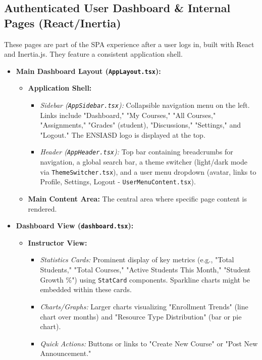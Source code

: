 \documentclass[12pt,a4paper]{article}
\begin{document}
\subsection{Authenticated User Dashboard \& Internal Pages (React/Inertia)}

These pages are part of the SPA experience after a user logs in, built with React and Inertia.js. They feature a consistent application shell.

\begin{itemize}
    \item \textbf{Main Dashboard Layout (\texttt{AppLayout.tsx}):}
    \begin{itemize}
        \item \textbf{Application Shell:}
        \begin{itemize}
            \item \textit{Sidebar (\texttt{AppSidebar.tsx}):} Collapsible navigation menu on the left. Links include "Dashboard," "My Courses," "All Courses," "Assignments," "Grades" (student), "Discussions," "Settings," and "Logout." The ENSIASD logo is displayed at the top.
            \item \textit{Header (\texttt{AppHeader.tsx}):} Top bar containing breadcrumbs for navigation, a global search bar, a theme switcher (light/dark mode via \texttt{ThemeSwitcher.tsx}), and a user menu dropdown (avatar, links to Profile, Settings, Logout - \texttt{UserMenuContent.tsx}).
        \end{itemize}
        \item \textbf{Main Content Area:} The central area where specific page content is rendered.
    \end{itemize}
    \item \textbf{Dashboard View (\texttt{dashboard.tsx}):}
    \begin{itemize}
        \item \textbf{Instructor View:}
        \begin{itemize}
            \item \textit{Statistics Cards:} Prominent display of key metrics (e.g., "Total Students," "Total Courses," "Active Students This Month," "Student Growth \%") using \texttt{StatCard} components. Sparkline charts might be embedded within these cards.
            \item \textit{Charts/Graphs:} Larger charts visualizing "Enrollment Trends" (line chart over months) and "Resource Type Distribution" (bar or pie chart).
            \item \textit{Quick Actions:} Buttons or links to "Create New Course" or "Post New Announcement."

\end{itemize}
\end{itemize}
\end{itemize}
\end{document}
